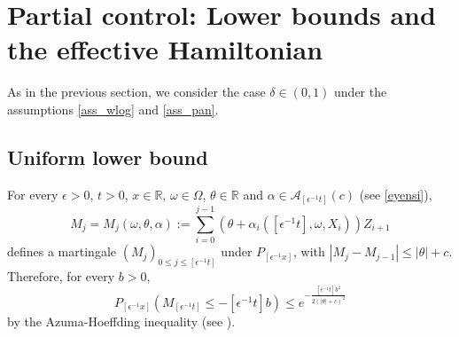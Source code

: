 \documentclass[a4paper]{amsart}
\numberwithin{equation}{section}
\theoremstyle{plain}
\theoremstyle{remark}
\begin{document}
\section{Partial control: Lower bounds and the effective Hamiltonian}

As in the previous section, we consider the case $\delta\in(0,1)$ under the assumptions \eqref{ass_wlog} and \eqref{ass_pan}.

\subsection{Uniform lower bound}\label{martingale}

For every ${\epsilon}>0$, $t>0$, $x\in\mathbb{R}$, $\omega\in\Omega$, $\theta\in\mathbb{R}$ and $\alpha\in\mathcal{A}_{[{\epsilon^{-1}} t]}(c)$ (see \eqref{eyensi}),
$$M_j = M_j(\omega,\theta,\alpha) := \sum_{i=0}^{j-1}(\theta + \alpha_i([{\epsilon^{-1}} t],\omega,X_i))Z_{i+1}$$ defines a martingale $(M_j)_{0\le j\le[{\epsilon^{-1}} t]}$ under $P_{[{\epsilon^{-1}} x]}$, with $|M_j - M_{j-1}| \le |\theta| + c$. Therefore, for every $b>0$,
$$P_{[{\epsilon^{-1}} x]}(M_{[{\epsilon^{-1}} t]} \le - [{\epsilon^{-1}} t]b) \le e^{-\frac{[{\epsilon^{-1}} t]b^2}{2(|\theta| + c)^2}}$$
by the Azuma-Hoeffding inequality (see \cite[Section 12.2]{GriSti2001}).
\end{document}
